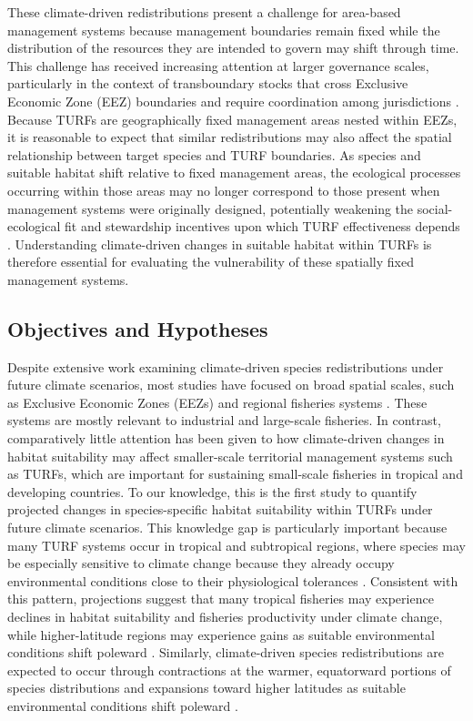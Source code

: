 \documentclass[12pt]{article}
\begin{document}
These climate-driven redistributions present a challenge for area-based management systems because management boundaries remain fixed while the distribution of the resources they are intended to govern may shift through time. This challenge has received increasing attention at larger governance scales, particularly in the context of transboundary stocks that cross Exclusive Economic Zone (EEZ) boundaries and require coordination among jurisdictions \citep{Pinsky2018, Pecl2017}. Because TURFs are geographically fixed management areas nested within EEZs, it is reasonable to expect that similar redistributions may also affect the spatial relationship between target species and TURF boundaries. As species and suitable habitat shift relative to fixed management areas, the ecological processes occurring within those areas may no longer correspond to those present when management systems were originally designed, potentially weakening the social-ecological fit and stewardship incentives upon which TURF effectiveness depends \citep{McCay2017, PoonBonzon2013, AcevesBueno2018, Nenadovic2026}. Understanding climate-driven changes in suitable habitat within TURFs is therefore essential for evaluating the vulnerability of these spatially fixed management systems.

\subsection{Objectives and Hypotheses}

Despite extensive work examining climate-driven species redistributions under future climate scenarios, most studies have focused on broad spatial scales, such as Exclusive Economic Zones (EEZs) and regional fisheries systems \citep{Pinsky2018, Pecl2017, Cheung2010}. These systems are mostly relevant to industrial and large-scale fisheries. In contrast, comparatively little attention has been given to how climate-driven changes in habitat suitability may affect smaller-scale territorial management systems such as TURFs, which are important for sustaining small-scale fisheries in tropical and developing countries. To our knowledge, this is the first study to quantify projected changes in species-specific habitat suitability within TURFs under future climate scenarios. This knowledge gap is particularly important because many TURF systems occur in tropical and subtropical regions, where species may be especially sensitive to climate change because they already occupy environmental conditions close to their physiological tolerances \citep{Portner2007, Nguyen2011, Pecl2017}. Consistent with this pattern, projections suggest that many tropical fisheries may experience declines in habitat suitability and fisheries productivity under climate change, while higher-latitude regions may experience gains as suitable environmental conditions shift poleward \citep{Cheung2010}. Similarly, climate-driven species redistributions are expected to occur through contractions at the warmer, equatorward portions of species distributions and expansions toward higher latitudes as suitable environmental conditions shift poleward \citep{FredstonHermann2020}.
\end{document}
